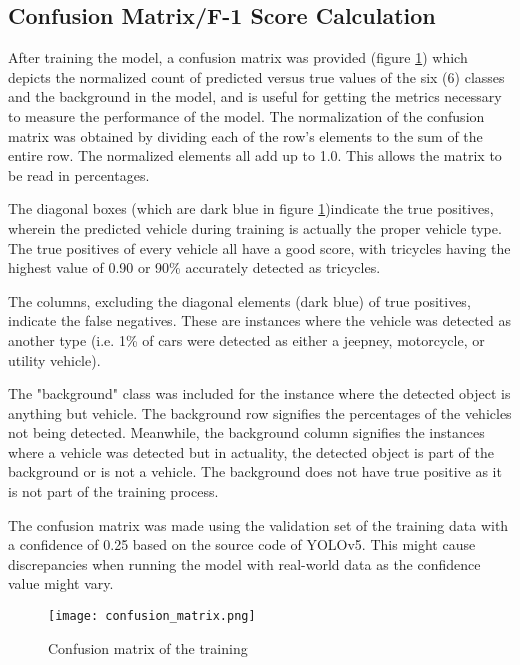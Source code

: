 \subsection{Confusion Matrix/F-1 Score Calculation}
After training the model, a confusion matrix was provided (figure \ref{fig:con_mat}) which depicts the normalized count of predicted versus true values of the six (6) classes and the background in the model, and is useful for getting the metrics necessary to measure the performance of the model.
The normalization of the confusion matrix was obtained by dividing each of the row's elements to the sum of the entire row. The normalized elements all add up to 1.0. This allows the matrix to be read in percentages.

The diagonal boxes (which are dark blue in figure \ref{fig:con_mat})indicate the true positives, wherein the predicted vehicle during training is actually the proper vehicle type. The true positives of every vehicle all have a good score, with tricycles having the highest value of 0.90 or 90\% accurately detected as tricycles. 

The columns, excluding the diagonal elements (dark blue) of true positives, indicate the false negatives. These are instances where the vehicle was detected as another type (i.e. 1\% of cars were detected as either a jeepney, motorcycle, or utility vehicle).

The "background" class was included for the instance where the detected object is anything but vehicle. The background row signifies the percentages of the vehicles not being detected. Meanwhile, the background column signifies the instances where a vehicle was detected but in actuality, the detected object is part of the background or is not a vehicle. The background does not have true positive as it is not part of the training process.


 The confusion matrix was made using the validation set of the training data with a confidence of 0.25 based on the source code of YOLOv5. This might cause discrepancies when running the model with real-world data as the confidence value might vary. 


\begin{figure}[!htbp]
	\texttt{[image: confusion\_matrix.png]}
	\caption{Confusion matrix of the training}
	\label{fig:con_mat}
\end{figure}
\FloatBarrier

